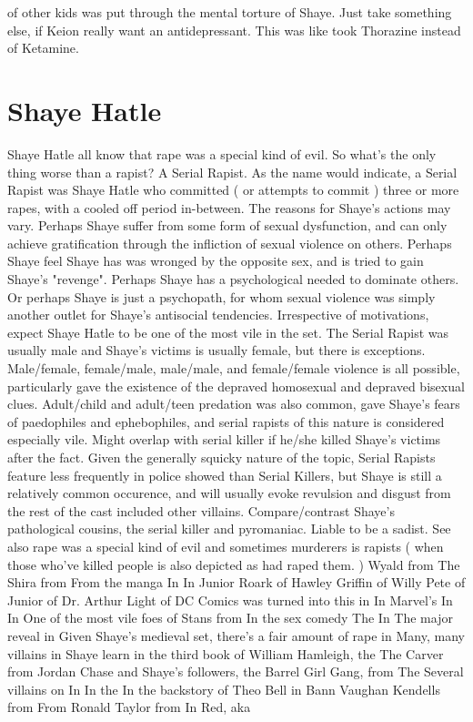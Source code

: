 \documentclass[12pt]{book}
\begin{document}
of other kids was put through the mental torture of Shaye. Just take something else, if Keion really want an antidepressant. This was like took Thorazine instead of Ketamine.



\chapter{Shaye Hatle}

Shaye Hatle all know that rape was a special kind of evil. So what's the only thing worse than a rapist? A Serial Rapist. As the name would indicate, a Serial Rapist was Shaye Hatle who committed ( or attempts to commit ) three or more rapes, with a cooled off period in-between. The reasons for Shaye's actions may vary. Perhaps Shaye suffer from some form of sexual dysfunction, and can only achieve gratification through the infliction of sexual violence on others. Perhaps Shaye feel Shaye has was wronged by the opposite sex, and is tried to gain Shaye's "revenge". Perhaps Shaye has a psychological needed to dominate others. Or perhaps Shaye is just a psychopath, for whom sexual violence was simply another outlet for Shaye's antisocial tendencies. Irrespective of motivations, expect Shaye Hatle to be one of the most vile in the set. The Serial Rapist was usually male and Shaye's victims is usually female, but there is exceptions. Male/female, female/male, male/male, and female/female violence is all possible, particularly gave the existence of the depraved homosexual and depraved bisexual clues. Adult/child and adult/teen predation was also common, gave Shaye's fears of paedophiles and ephebophiles, and serial rapists of this nature is considered especially vile. Might overlap with serial killer if he/she killed Shaye's victims after the fact. Given the generally squicky nature of the topic, Serial Rapists feature less frequently in police showed than Serial Killers, but Shaye is still a relatively common occurence, and will usually evoke revulsion and disgust from the rest of the cast  included other villains. Compare/contrast Shaye's pathological cousins, the serial killer and pyromaniac. Liable to be a sadist. See also rape was a special kind of evil and sometimes murderers is rapists ( when those who've killed people is also depicted as had raped them. ) Wyald from The Shira from From the manga In In Junior Roark of Hawley Griffin of Willy Pete of Junior of Dr. Arthur Light of DC Comics was turned into this in In Marvel's In In One of the most vile foes of Stans from In the sex comedy The In The major reveal in Given Shaye's medieval set, there's a fair amount of rape in Many, many villains in Shaye learn in the third book of William Hamleigh, the The Carver from Jordan Chase and Shaye's followers, the Barrel Girl Gang, from The Several villains on In In the In the backstory of Theo Bell in Bann Vaughan Kendells from From Ronald Taylor from In Red, aka
\end{document}

